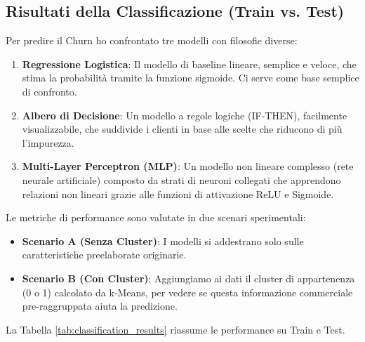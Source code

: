 \documentclass[a4paper,11pt]{article}
\begin{document}
\subsection{Risultati della Classificazione (Train vs. Test)}
Per predire il Churn ho confrontato tre modelli con filosofie diverse:
\begin{enumerate}
    \item \textbf{Regressione Logistica}: Il modello di baseline lineare, semplice e veloce, che stima la probabilità tramite la funzione sigmoide. Ci serve come base semplice di confronto.
    \item \textbf{Albero di Decisione}: Un modello a regole logiche (IF-THEN), facilmente visualizzabile, che suddivide i clienti in base alle scelte che riducono di più l'impurezza.
    \item \textbf{Multi-Layer Perceptron (MLP)}: Un modello non lineare complesso (rete neurale artificiale) composto da strati di neuroni collegati che apprendono relazioni non lineari grazie alle funzioni di attivazione ReLU e Sigmoide.
\end{enumerate}

Le metriche di performance sono valutate in due scenari sperimentali:
\begin{itemize}
    \item \textbf{Scenario A (Senza Cluster)}: I modelli si addestrano solo sulle caratteristiche preelaborate originarie.
    \item \textbf{Scenario B (Con Cluster)}: Aggiungiamo ai dati il cluster di appartenenza (0 o 1) calcolato da k-Means, per vedere se questa informazione commerciale pre-raggruppata aiuta la predizione.
\end{itemize}

La Tabella \ref{tab:classification_results} riassume le performance su Train e Test.
\end{document}
